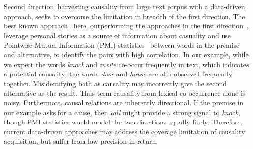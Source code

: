 Second direction, harvesting causality from large
text corpus with a data-driven approach, seeks to overcome
the limitation in breadth of the first direction.
The best known approach~\cite{gordon2011commonsense} here,
outperforming the approaches in the first direction~\cite{gordon2012copa},
leverage personal stories as a source of information about casuality and use
Pointwise Mutual Information (PMI) statistics~\cite{Mihalcea2006:CKM}
between words in the premise and alternative, to identify the pairs with
high correlation.
In our example, while we expect the words \emph{knock} and \emph{invite}
co-occur frequently in text, which indicates a potential causality;
the words \emph{door} and \emph{house} are also observed frequently together.
Misidentifying both as causality may incorrectly give the second
alternative as the result.
Thus term causality from lexical co-occurrence alone is noisy.
Furthermore, causal relations are inherently directional.
If the premise in our example asks for a cause, then \emph{call}
might provide a strong signal to \emph{knock}, though PMI statistics
would model the two directions equally likely.
Therefore, current data-driven approaches may address the coverage
limitation of causality acquisition, but suffer from low precision in return.



